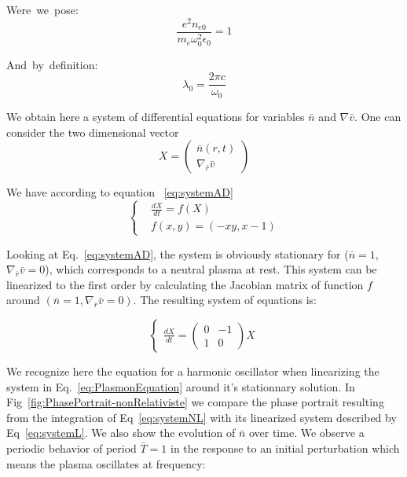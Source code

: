 \begin{multicols}{2}
\mbox{Were we pose:}
$$
\frac{e^2 n_{e0}}{m_e\omega_0^2 \epsilon_0} = 1 
$$

\mbox{And by definition:}
$$
\lambda_0= \frac{2 \pi c}{\omega_0}
$$
\end{multicols}

\noindent We obtain here a system of differential equations for variables $\bar{n}$ and $\nabla \bar{v}$. One can consider the two dimensional vector 
$$
X = 
 \left( \begin{array}{c}
\bar{n}(r,t) \\
\nabla_{\bar{r}} \bar{v} \end{array} \right)
$$

\noindent We have according to equation ~\ref{eq:systemAD}
\begin{equation}
  \left\{
      \begin{aligned}
     & \frac{d X}{dt} = f(X) \\
     & f(x,y) = (-x y, x-1)
      \end{aligned}
    \right.
    \label{eq:systemNL}
\end{equation}

\noindent Looking at Eq.~\ref{eq:systemAD}, the system is obviously stationary for ($\bar{n} = 1$, $\nabla_{\bar{r}} \bar{v} = 0$), which corresponds to a neutral plasma at rest.
This system can be linearized to the first order by calculating the Jacobian matrix of function $f$ around $(\bar{n} = 1 , \nabla_{\bar{r}} \bar{v} = 0)$. The resulting system of equations is:

\begin{equation}
  \left\{
      \begin{aligned}
     \frac{dX}{dt} = 
 \left( \begin{array}{cc}
0 & -1\\
1 &  0  \end{array} \right)X
      \end{aligned}
    \right.
\label{eq:systemL}
\end{equation}

\noindent We recognize here the equation for a harmonic oscillator \cite{thaury2010high,chen1985acceleration} when linearizing the system in Eq.~\ref{eq:PlasmonEquation} around it's stationnary solution. In Fig~\ref{fig:PhasePortrait-nonRelativiste} we compare the phase portrait resulting from the integration of Eq~\ref{eq:systemNL} with its linearized system described by Eq~\ref{eq:systemL}. We also show the evolution of $\bar{n}$ over time. We observe a periodic behavior of period $\bar{T} = 1$ in the response to an initial perturbation which means the plasma oscillates at frequency:


